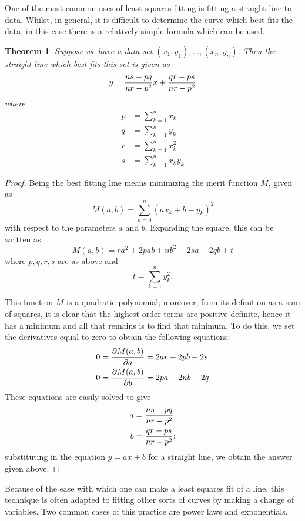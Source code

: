 \documentclass[12pt]{article}
\newtheorem{thm}{Theorem}
\begin{document}
One of the most common uses of least squares fitting is fitting a straight line to 
data.  Whilst, in general, it is difficult to determine the curve which best fits
the data, in this case there is a relatively simple formula which can be used.

\begin{thm}
Suppose we have a data set $(x_1,y_1), \ldots, (x_n,y_n)$.  Then the straight 
line which best fits this set is given as 
\[ 
y = {ns - pq \over nr - p^2} x + {qr - ps \over nr - p^2}
\]
where
\begin{align}
p &= \sum_{k=1}^n x_k \\
q &= \sum_{k=1}^n y_k \\
r &= \sum_{k=1}^n x_k^2 \\
s &= \sum_{k=1}^n x_k y_k
\end{align}
\end{thm}

\begin{proof}
Being the best fitting line means minimizing the merit function $M$, given as
\[
M(a,b) = \sum_{k=0}^n (a x_k + b - y_k)^2
\]
with respect to the parameters $a$ and $b$.  Expanding the square, this can be 
written as 
\[
M(a,b) = r a^2 + 2pab + nb^2 - 2sa - 2qb + t
\]
where $p,q,r,s$ are as above and 
\[
t = \sum_{k=1}^n y_k^2 .
\]

This function $M$ is a quadratic polynomial; moreover, from its definition as a 
sum of squares, it is clear that the highest order terms are positive definite, 
hence it has a minimum and all that remains is to find that minimum.  To do this, 
we set the derivatives equal to zero to obtain the following equations:
\begin{align}
0 = {\partial M(a,b) \over \partial a} & = 2ar + 2pb - 2s \\
0 = {\partial M(a,b) \over \partial b} & = 2pa + 2nb - 2q
\end{align}
These equations are easily solved to give
\begin{align}
a &= {ns - pq \over nr - p^2} \\
b &= {qr - ps \over nr - p^2} ;
\end{align}
substituting in the equation $y = ax  + b$ for a straight line, we obtain 
the answer given above.
\end{proof}

Because of the ease with which one can make a least squares fit of a line, this
technique is often adapted to fitting other sorts of curves by making a change
of variables.  Two common cases of this practice are power laws and exponentials.
\end{document}
